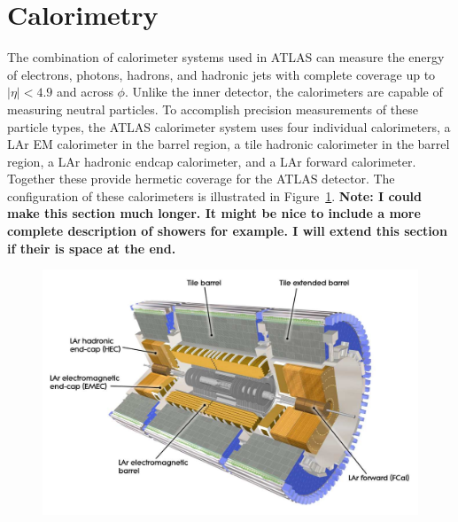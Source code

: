 
\section{Calorimetry}
\label{sec:calorimetry}

The combination of calorimeter systems used in \ac{ATLAS} can measure the energy of electrons, photons, hadrons, and hadronic jets with complete coverage up to $|\eta| < 4.9$ and across $\phi$.
Unlike the inner detector, the calorimeters are capable of measuring neutral particles.
To accomplish precision measurements of these particle types, the \ac{ATLAS} calorimeter system uses four individual calorimeters, a \ac{LAr} \acl{EM} calorimeter in the barrel region, a tile hadronic calorimeter in the barrel region, a \ac{LAr} hadronic endcap calorimeter, and a \ac{LAr} forward calorimeter.
Together these provide hermetic coverage for the \ac{ATLAS} detector.
The configuration of these calorimeters is illustrated in Figure~\ref{fig:calo_overview}. 
\textbf{Note: I could make this section much longer. It might be nice to include a more complete description of showers for example. I will extend this section if their is space at the end.}

\begin{figure}[hbtp]
\includegraphics[width=\fullfig]{figures/calo_overview.pdf}
\caption{}
\label{fig:calo_overview}
\end{figure}

